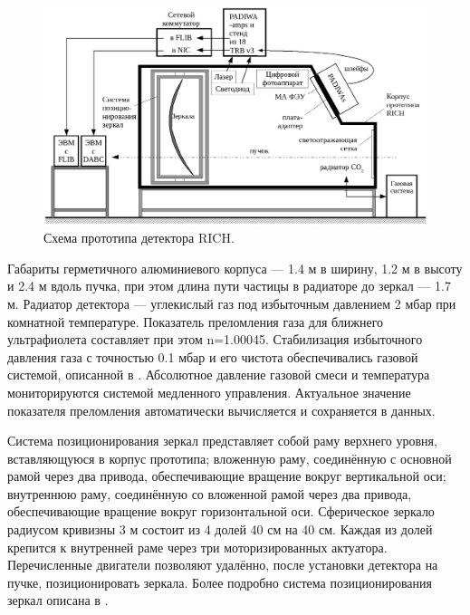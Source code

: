 \begin{figure}
\includegraphics[width=1.0\textwidth]{pictures/10_Beamtime_setup_RICH_text.png}
\caption{Схема прототипа детектора RICH.}
\label{fig:Prototype}
\end{figure}

Габариты герметичного алюминиевого корпуса --- 1.4 м в ширину, 1.2 м в высоту и 2.4 м вдоль пучка, при этом длина пути частицы в радиаторе до зеркал --- 1.7 м. Радиатор детектора --- углекислый газ под избыточным давлением 2 мбар при комнатной температуре. Показатель преломления газа для ближнего ультрафиолета составляет при этом n=1.00045. Стабилизация избыточного давления газа с точностью 0.1 мбар и его чистота обеспечивались газовой системой, описанной в \cite{}. Абсолютное давление газовой смеси и температура мониторируются системой медленного управления. Актуальное значение показателя преломления автоматически вычисляется и сохраняется в данных.

Система позиционирования зеркал представляет собой раму верхнего уровня, вставляющуюся в корпус прототипа; вложенную раму, соединённую с основной рамой через два привода, обеспечивающие вращение вокруг вертикальной оси; внутреннюю раму, соединённую со вложенной рамой через два привода, обеспечивающие вращение вокруг горизонтальной оси. Сферическое зеркало радиусом кривизны 3 м состоит из 4 долей 40 см на 40 см. Каждая из долей крепится к внутренней раме через три моторизированных актуатора. Перечисленные двигатели позволяют удалённо, после установки детектора на пучке, позиционировать зеркала. Более подробно система позиционирования зеркал описана в \cite{}.

